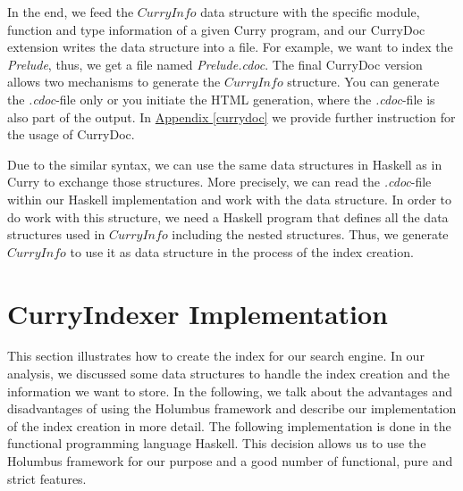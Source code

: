 \documentclass[%
	latex,%
	a4paper,%
	oneside,%
	chapterprefix,%
	headsepline,%
	12pt%
]{scrbook}
\newcommand{\Conid}[1]{\mathit{#1}}
\begin{document}
In the end, we feed the \ensuremath{\Conid{CurryInfo}} data structure with the specific
module, function and type information of a given Curry program, and our
CurryDoc extension writes the data structure into a file. %
For example, we want to index the \emph{Prelude}, thus, we get a file named
\emph{Prelude.cdoc}. %
The final CurryDoc version allows two mechanisms to generate the
\ensuremath{\Conid{CurryInfo}} structure. %
You can generate the \emph{.cdoc}-file only or you initiate the HTML
generation, where the \emph{.cdoc}-file is also part of the output. %
In \hyperref[currydoc]{Appendix \ref{currydoc}} we provide further
instruction for the usage of CurryDoc.

Due to the similar syntax, we can use the same data structures in
Haskell as in Curry to exchange those structures. %
More precisely, we can read the \emph{.cdoc}-file within our Haskell
implementation and work with the data structure. %
In order to do work with this structure, we need a Haskell program that defines all the
data structures used in \ensuremath{\Conid{CurryInfo}} including the nested structures. %
Thus, we generate \ensuremath{\Conid{CurryInfo}} to use it as data structure in the
process of the index creation.

\section{CurryIndexer Implementation}\label{implementation:index}

This section illustrates how to create the index for our search
engine. %
In our analysis, we discussed some data structures to handle the index
creation and the information we want to store. %
In the following, we talk about the advantages and disadvantages of
using the Holumbus framework and describe our implementation of the
index creation in more detail. %
The following implementation is done in the functional
programming language Haskell. %
This decision allows us to use the Holumbus framework for our purpose
and a good number of functional, pure and strict features.\\
\end{document}

